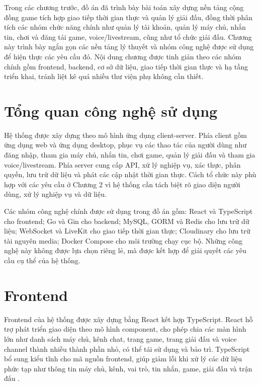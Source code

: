 \documentclass[../DoAn.tex]{subfiles}
\begin{document}
Trong các chương trước, đồ án đã trình bày bài toán xây dựng nền tảng cộng đồng game tích hợp giao tiếp thời gian thực và quản lý giải đấu, đồng thời phân tích các nhóm chức năng chính như quản lý tài khoản, quản lý máy chủ, nhắn tin, chơi và đăng tải game, voice/livestream, cũng như tổ chức giải đấu. Chương này trình bày ngắn gọn các nền tảng lý thuyết và nhóm công nghệ được sử dụng để hiện thực các yêu cầu đó. Nội dung chương được tinh giản theo các nhóm chính gồm frontend, backend, cơ sở dữ liệu, giao tiếp thời gian thực và hạ tầng triển khai, tránh liệt kê quá nhiều thư viện phụ không cần thiết.

\section{Tổng quan công nghệ sử dụng}
\label{section:3.1}

Hệ thống được xây dựng theo mô hình ứng dụng client-server. Phía client gồm ứng dụng web và ứng dụng desktop, phục vụ các thao tác của người dùng như đăng nhập, tham gia máy chủ, nhắn tin, chơi game, quản lý giải đấu và tham gia voice/livestream. Phía server cung cấp API, xử lý nghiệp vụ, xác thực, phân quyền, lưu trữ dữ liệu và phát các cập nhật thời gian thực. Cách tổ chức này phù hợp với các yêu cầu ở Chương 2 vì hệ thống cần tách biệt rõ giao diện người dùng, xử lý nghiệp vụ và dữ liệu.

Các nhóm công nghệ chính được sử dụng trong đồ án gồm: React và TypeScript cho frontend; Go và Gin cho backend; MySQL, GORM và Redis cho lưu trữ dữ liệu; WebSocket và LiveKit cho giao tiếp thời gian thực; Cloudinary cho lưu trữ tài nguyên media; Docker Compose cho môi trường chạy cục bộ. Những công nghệ này không được lựa chọn riêng lẻ, mà được kết hợp để giải quyết các yêu cầu cụ thể của hệ thống.

\section{Frontend}
\label{section:3.2}

Frontend của hệ thống được xây dựng bằng React kết hợp TypeScript. React hỗ trợ phát triển giao diện theo mô hình component, cho phép chia các màn hình lớn như danh sách máy chủ, kênh chat, trang game, trang giải đấu và voice channel thành nhiều thành phần nhỏ, có thể tái sử dụng và bảo trì. TypeScript bổ sung kiểu tĩnh cho mã nguồn frontend, giúp giảm lỗi khi xử lý các dữ liệu phức tạp như thông tin máy chủ, kênh, vai trò, tin nhắn, game, giải đấu và trận đấu \cite{react-docs,typescript-docs}.
\end{document}
